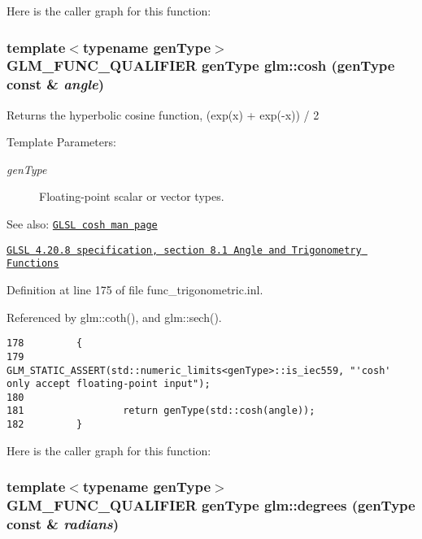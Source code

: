 Here is the caller graph for this function:\hypertarget{group__core__func__trigonometric_g522e0c2f8dbac0df60a2bf436fb88e69}{
\subsubsection[cosh]{\setlength{\rightskip}{0pt plus 5cm}template$<$typename genType$>$ GLM\_\-FUNC\_\-QUALIFIER genType glm::cosh (genType const \& {\em angle})}}
\label{group__core__func__trigonometric_g522e0c2f8dbac0df60a2bf436fb88e69}


Returns the hyperbolic cosine function, (exp(x) + exp(-x)) / 2

\begin{Desc}
\item[Template Parameters:]
\begin{description}
\item[{\em genType}]Floating-point scalar or vector types.\end{description}
\end{Desc}
\begin{Desc}
\item[See also:]\href{http://www.opengl.org/sdk/docs/manglsl/xhtml/cosh.xml}{\tt GLSL cosh man page} 

\href{http://www.opengl.org/registry/doc/GLSLangSpec.4.20.8.pdf}{\tt GLSL 4.20.8 specification, section 8.1 Angle and Trigonometry Functions} \end{Desc}


Definition at line 175 of file func\_\-trigonometric.inl.

Referenced by glm::coth(), and glm::sech().

\begin{Code}\begin{verbatim}178         {
179                 GLM_STATIC_ASSERT(std::numeric_limits<genType>::is_iec559, "'cosh' only accept floating-point input");
180 
181                 return genType(std::cosh(angle));
182         }
\end{verbatim}
\end{Code}




Here is the caller graph for this function:\hypertarget{group__core__func__trigonometric_gcb63bdf23d5e084a5b6a2ed0ae395e64}{
\subsubsection[degrees]{\setlength{\rightskip}{0pt plus 5cm}template$<$typename genType$>$ GLM\_\-FUNC\_\-QUALIFIER genType glm::degrees (genType const \& {\em radians})}}
\label{group__core__func__trigonometric_gcb63bdf23d5e084a5b6a2ed0ae395e64}


